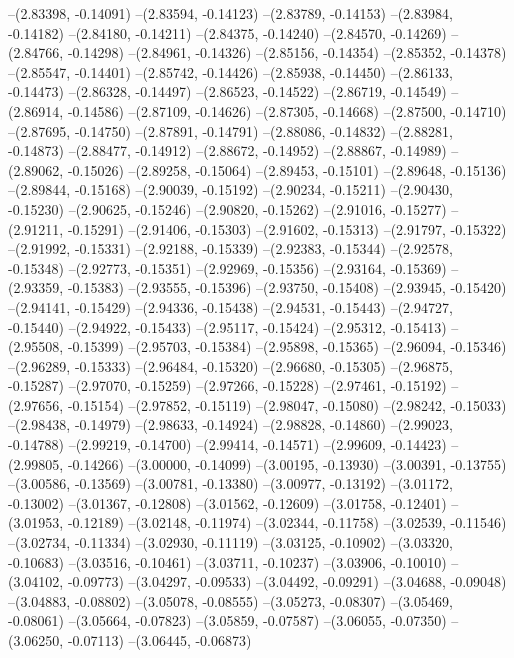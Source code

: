--(2.83398, -0.14091)
--(2.83594, -0.14123)
--(2.83789, -0.14153)
--(2.83984, -0.14182)
--(2.84180, -0.14211)
--(2.84375, -0.14240)
--(2.84570, -0.14269)
--(2.84766, -0.14298)
--(2.84961, -0.14326)
--(2.85156, -0.14354)
--(2.85352, -0.14378)
--(2.85547, -0.14401)
--(2.85742, -0.14426)
--(2.85938, -0.14450)
--(2.86133, -0.14473)
--(2.86328, -0.14497)
--(2.86523, -0.14522)
--(2.86719, -0.14549)
--(2.86914, -0.14586)
--(2.87109, -0.14626)
--(2.87305, -0.14668)
--(2.87500, -0.14710)
--(2.87695, -0.14750)
--(2.87891, -0.14791)
--(2.88086, -0.14832)
--(2.88281, -0.14873)
--(2.88477, -0.14912)
--(2.88672, -0.14952)
--(2.88867, -0.14989)
--(2.89062, -0.15026)
--(2.89258, -0.15064)
--(2.89453, -0.15101)
--(2.89648, -0.15136)
--(2.89844, -0.15168)
--(2.90039, -0.15192)
--(2.90234, -0.15211)
--(2.90430, -0.15230)
--(2.90625, -0.15246)
--(2.90820, -0.15262)
--(2.91016, -0.15277)
--(2.91211, -0.15291)
--(2.91406, -0.15303)
--(2.91602, -0.15313)
--(2.91797, -0.15322)
--(2.91992, -0.15331)
--(2.92188, -0.15339)
--(2.92383, -0.15344)
--(2.92578, -0.15348)
--(2.92773, -0.15351)
--(2.92969, -0.15356)
--(2.93164, -0.15369)
--(2.93359, -0.15383)
--(2.93555, -0.15396)
--(2.93750, -0.15408)
--(2.93945, -0.15420)
--(2.94141, -0.15429)
--(2.94336, -0.15438)
--(2.94531, -0.15443)
--(2.94727, -0.15440)
--(2.94922, -0.15433)
--(2.95117, -0.15424)
--(2.95312, -0.15413)
--(2.95508, -0.15399)
--(2.95703, -0.15384)
--(2.95898, -0.15365)
--(2.96094, -0.15346)
--(2.96289, -0.15333)
--(2.96484, -0.15320)
--(2.96680, -0.15305)
--(2.96875, -0.15287)
--(2.97070, -0.15259)
--(2.97266, -0.15228)
--(2.97461, -0.15192)
--(2.97656, -0.15154)
--(2.97852, -0.15119)
--(2.98047, -0.15080)
--(2.98242, -0.15033)
--(2.98438, -0.14979)
--(2.98633, -0.14924)
--(2.98828, -0.14860)
--(2.99023, -0.14788)
--(2.99219, -0.14700)
--(2.99414, -0.14571)
--(2.99609, -0.14423)
--(2.99805, -0.14266)
--(3.00000, -0.14099)
--(3.00195, -0.13930)
--(3.00391, -0.13755)
--(3.00586, -0.13569)
--(3.00781, -0.13380)
--(3.00977, -0.13192)
--(3.01172, -0.13002)
--(3.01367, -0.12808)
--(3.01562, -0.12609)
--(3.01758, -0.12401)
--(3.01953, -0.12189)
--(3.02148, -0.11974)
--(3.02344, -0.11758)
--(3.02539, -0.11546)
--(3.02734, -0.11334)
--(3.02930, -0.11119)
--(3.03125, -0.10902)
--(3.03320, -0.10683)
--(3.03516, -0.10461)
--(3.03711, -0.10237)
--(3.03906, -0.10010)
--(3.04102, -0.09773)
--(3.04297, -0.09533)
--(3.04492, -0.09291)
--(3.04688, -0.09048)
--(3.04883, -0.08802)
--(3.05078, -0.08555)
--(3.05273, -0.08307)
--(3.05469, -0.08061)
--(3.05664, -0.07823)
--(3.05859, -0.07587)
--(3.06055, -0.07350)
--(3.06250, -0.07113)
--(3.06445, -0.06873)
